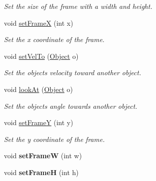 \begin{DoxyCompactItemize}
\begin{DoxyCompactList}\small\item\em Set the size of the frame with a width and height. \end{DoxyCompactList}\item 
void \hyperlink{classObject_ad4ad32edcec36e9fa63290070c991575}{set\+FrameX} (int x)\hypertarget{classObject_ad4ad32edcec36e9fa63290070c991575}{}\label{classObject_ad4ad32edcec36e9fa63290070c991575}

\begin{DoxyCompactList}\small\item\em Set the x coordinate of the frame. \end{DoxyCompactList}\item 
void \hyperlink{classObject_afa2ef385cd0c7e76134d4a11b8643d38}{set\+Vel\+To} (\hyperlink{classObject}{Object} o)\hypertarget{classObject_afa2ef385cd0c7e76134d4a11b8643d38}{}\label{classObject_afa2ef385cd0c7e76134d4a11b8643d38}

\begin{DoxyCompactList}\small\item\em Set the object\textquotesingle{}s velocity toward another object. \end{DoxyCompactList}\item 
void \hyperlink{classObject_a327a4b938d5f97db0ca6b9c8722f6e35}{look\+At} (\hyperlink{classObject}{Object} o)\hypertarget{classObject_a327a4b938d5f97db0ca6b9c8722f6e35}{}\label{classObject_a327a4b938d5f97db0ca6b9c8722f6e35}

\begin{DoxyCompactList}\small\item\em Set the object\textquotesingle{}s angle towards another object. \end{DoxyCompactList}\item 
void \hyperlink{classObject_adbbc257d38397971e16016287b653952}{set\+FrameY} (int y)\hypertarget{classObject_adbbc257d38397971e16016287b653952}{}\label{classObject_adbbc257d38397971e16016287b653952}

\begin{DoxyCompactList}\small\item\em Set the y coordinate of the frame. \end{DoxyCompactList}\item 
void {\bfseries set\+FrameW} (int w)\hypertarget{classObject_a006f2d1cb18c9584436a0eda2d96c567}{}\label{classObject_a006f2d1cb18c9584436a0eda2d96c567}

\item 
void {\bfseries set\+FrameH} (int h)\hypertarget{classObject_add78987ddbf11953b68fc345a8795fe6}{}\label{classObject_add78987ddbf11953b68fc345a8795fe6}


\end{DoxyCompactItemize}
